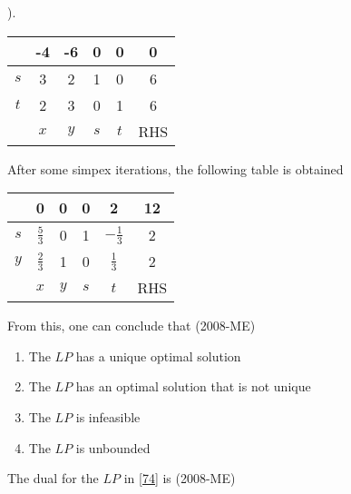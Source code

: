 ).\label{74} 
\begin{table}[H]
    \centering
\begin{tabular}[12pt]{ |c|c|c|c|c|c|}
    \hline
     & -4 & -6 & 0 & 0 & 0 \\
    \hline
    $s$ & 3 & 2 & 1 & 0 & 6\\
    \hline 
    $t$ & 2 & 3 & 0 & 1 & 6\\
    \hline
     & $x$ & $y$ & $s$ & $t$ &RHS\\
    \hline
    \end{tabular}

\end{table}
After some simpex iterations, the following table is obtained  
\begin{table}[H]
    \centering
\begin{tabular}[12pt]{ |c|c|c|c|c|c|}
    \hline
     & 0 & 0 & 0 & 2 & 12 \\
    \hline
    $s$ & $\frac{5}{3}$ & 0 & 1 & $-\frac{1}{3}$ & 2\\
    \hline 
    $y$ & $\frac{2}{3}$ & 1 & 0 & $\frac{1}{3}$ & 2\\
    \hline
     & $x$ & $y$ & $s$ & $t$ &RHS\\
    \hline
    \end{tabular}

\end{table}
From this, one can conclude that \hfill(2008-ME)
\begin{enumerate}
    \item The $LP$ has a unique optimal solution 
    \item The $LP$ has an optimal solution that is not unique 
    \item The $LP$ is infeasible 
    \item The $LP$ is unbounded
\end{enumerate}
\item The dual for the $LP$ in \ref{74} is \label{75} \hfill(2008-ME)

